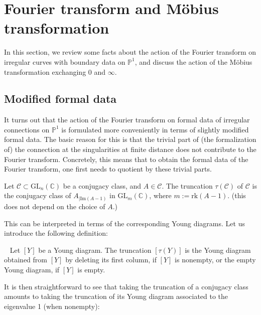 \documentclass[11pt,a4paper]{amsart}
\numberwithin{equation}{section}
\begin{document}
\section{Fourier transform and Möbius transformation}
\label{sec:Fourier}

In this section, we review some facts about the action of the Fourier transform on irregular curves with boundary data on $\mathbb P^1$, and discuss the action of the Möbius transformation exchanging 0 and $\infty$.


\subsection{Modified formal data} 

It turns out that the action of the Fourier transform on formal data of irregular connections on $\mathbb P^1$ is formulated more conveniently in terms of slightly modified formal data. The basic reason for this is that the trivial part of (the formalization of) the connection at the singularities at finite distance does not contribute to the Fourier transform. Concretely, this means that to obtain the formal data of the Fourier transform, one first needs to quotient by these trivial parts.

\begin{definition}
\label{def:truncation_conjuacy_class}
Let $\mathcal C\subset \mathrm{GL}_n(\mathbb C)$ be a conjugacy class, and $A\in \mathcal C$. The truncation $\tau(\mathcal C)$ of $\mathcal C$ is the conjugacy class of $A_{\vert{\mathrm{Im}(A-1)}}$ in $\mathrm{GL}_{m}(\mathbb C)$, where $m:=\mathrm{rk}(A-1)$.  (this does not depend on the choice of $A$.)
\end{definition}

This can be interpreted in terms of the corresponding Young diagrams. Let us introduce the following definition:

\begin{definition}~
\label{def:truncation_Young_diagram}
Let $[Y]$ be a Young diagram. The truncation $[\tau(Y)]$ is the Young diagram obtained from $[Y]$ by deleting its first column, if $[Y]$ is nonempty, or the empty Young diagram, if $[Y]$ is empty.
\end{definition}

It is then straightforward to see that taking the truncation of a conjugacy class amounts to taking the truncation of its Young diagram associated to the eigenvalue 1 (when nonempty):
\end{document}
